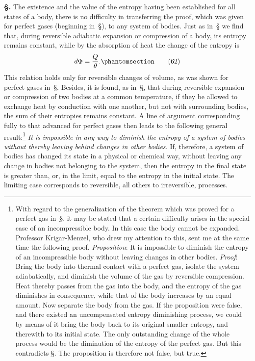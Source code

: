 \documentclass[12pt]{book}[2005/09/16]
\newcommand{\Chg}[2]{#2}
\newcommand{\Add}[1]{\Chg{}{#1}}
\newcommand{\Section}[1]{
  \medskip\par\textbf{§\;#1}
  \label{section:#1}
}
\newcommand{\SecRef}[2][§\;]{\hyperref[section:#2.]{{\upshape #1#2}}}
\newcommand{\Tag}[1]{%
  \phantomsection\label{eqn:#1}\tag*{\ensuremath{#1}}%
}
\newcommand{\PageSep}[1]{\ignorespaces}
\begin{document}
\Section{132.} The existence and the value of the entropy
having been established for all states of a body, there is
no difficulty in transferring the proof, which was given for
perfect gases (beginning in~\SecRef{119}), to any system of bodies.
Just as in~\SecRef{119} we find that, during reversible adiabatic
expansion or compression of a body, its entropy remains
constant, while by the absorption of heat the change of the
entropy is
\[
d\Phi = \frac{Q}{\theta}\Add{.}
\Tag{(62)}
\]
This relation holds only for reversible changes of volume,
as was shown for perfect gases in~\SecRef{120}. Besides, it is found,
as in~\SecRef{121}, that during reversible expansion or compression
of two bodies at a common temperature, if they be allowed
to exchange heat by conduction with one another, but not
with surrounding bodies, the sum of their entropies remains
constant. A line of argument corresponding fully to that
advanced for perfect gases then leads to the following
general result:\footnote
  {With regard to the generalization of the theorem which was proved for
  a perfect gas in~\SecRef{124}, it may be stated that a certain difficulty arises in the
  special case of an incompressible body. In this case the body cannot be
  expanded. Professor Krigar-Menzel, who drew my attention to this, sent
%
  me at the same time the following proof. \emph{Proposition}: It is impossible to
  diminish the entropy of an incompressible body without leaving changes in
  other bodies. \emph{Proof}: Bring the body into thermal contact with a perfect
  gas, isolate the system adiabatically, and diminish the volume of the gas by
  reversible compression. Heat thereby passes from the gas into the body, and
  the entropy of the gas diminishes in consequence, while that of the body
  increases by an equal amount. Now separate the body from the gas. If the
  proposition were false, and there existed an uncompensated entropy diminishing
  process, we could by means of it bring the body back to its original
  smaller entropy, and therewith to its initial state. The only outstanding
  change of the whole process would be the diminution of the entropy of the
  perfect gas. But this contradicts \SecRef{118}. The proposition is therefore not
  false, but true.}
\emph{It is impossible in any way to diminish the
\PageSep{100}
entropy of a system of bodies without thereby leaving behind
%
changes in other bodies.} If, therefore, a system of bodies has
changed its state in a physical or chemical way, without
leaving any change in bodies not belonging to the system,
then the entropy in the final state is greater than, or, in the
limit, equal to the entropy in the initial state. The limiting
case corresponds to reversible, all others to irreversible,
processes.
\end{document}
